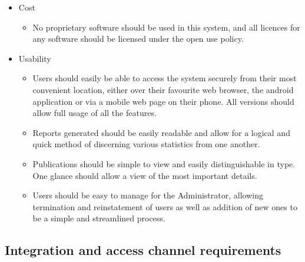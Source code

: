 \documentclass{article}
\begin{document}
\begin{itemize}
\begin{itemize}
			\end{itemize}
			\item Cost
			\begin{itemize}
				\item No proprietary software should be used in this system, and all licences for any software should be licensed under the open use policy.
			\end{itemize}
			\item Usability
			\begin{itemize}
				\item Users should easily be able to access the system securely from their most convenient location, either over their favourite web browser, the android application or via a mobile web page on their phone. All versions should allow full usage of all the features.
				\item Reports generated should be easily readable and allow for a logical and quick method of discerning various statistics from one another.
				\item Publications should be simple to view and easily distinguishable in type. One glance should allow a view of the most important details.
				\item Users should be easy to manage for the Administrator, allowing termination and reinstatement of users as well as addition of new ones to be a simple and streamlined process.
			\end{itemize}
		\end{itemize}
		
		\cleardoublepage
		
	\subsection{Integration and access channel requirements}\label{subsec:integration}
		
\end{document}
